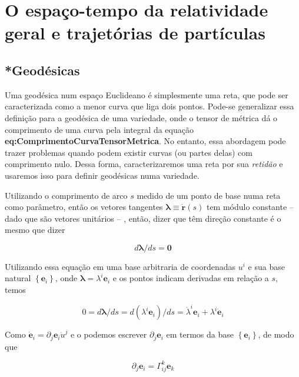 \chapter{O espaço-tempo da relatividade geral e trajetórias de partículas}\label{cap:EspacoTempoRelatividadeGeralTrajetoriaParticulas}
\section{*Geodésicas}\label{sec:Geodesicas}
Uma geodésica num espaço Euclideano é simplesmente uma reta, que pode ser caracterizada como a menor curva que liga dois pontos. Pode-se generalizar essa definição para a geodésica de uma variedade, onde o tensor de métrica 
dá o comprimento de uma curva pela integral da equação \textbf{eq:ComprimentoCurvaTensorMetrica}. No entanto, essa abordagem pode trazer problemas quando podem existir curvas (ou partes delas) com comprimento nulo. Dessa forma, caracterizaremos uma reta por sua \textit{retidão} e usaremos isso para definir geodésicas numa variedade.

Utilizando o comprimento de arco $ s $ medido de um ponto de base numa reta como parâmetro, então os vetores tangentes $ \boldsymbol{\lambda} \equiv \dot{\mathbf{r}}(s) $ tem módulo constante
 -- dado que são vetores unitários --%
, então, dizer que têm direção constante é o mesmo que dizer

\begin{equation}\label{eq:VetorTangenteConstante}
d \boldsymbol{\lambda} / d s=\mathbf{0}
\end{equation}

Utilizando essa equação em uma base arbitraria de coordenadas $ u^i $ e sua base natural $ \left\{\mathbf{e}_{i}\right\} $, onde $ \boldsymbol{\lambda}=\lambda^{i} \mathbf{e}_{i} $ e os pontos indicam derivadas em relação a $ s $, temos

\begin{equation}\label{eq:VetorTangenteConstanteBase}
0=d \boldsymbol{\lambda} / d s=d\left(\lambda^{i} \mathbf{e}_{i}\right) / d s=\dot{\lambda}^{i} \mathbf{e}_{i}+\lambda^{i} \dot{\mathbf{e}}_{i}
\end{equation}

Como $ \dot{\mathbf{e}}_{i}=\partial_{j} \mathbf{e}_{i} \dot{u}^{j} $ e o podemos escrever $ \partial_{j} \mathbf{e}_{i}  $ em termos da base $ \left\{\mathbf{e}_{i}\right\} $, de modo que

\begin{equation}\label{eq:GammaDefinicao}
\partial_{j} \mathbf{e}_{i}=\Gamma_{i j}^{k} \mathbf{e}_{k}
\end{equation}

